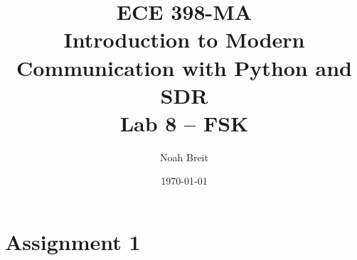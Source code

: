 \documentclass[
	letterpaper, %
	10pt, %
]{CSUniSchoolLabReport}
\title{ECE 398-MA \\ Introduction to Modern Communication with Python and SDR \\ Lab 8 -- FSK} %
\author{Noah Breit} %
\date{\today} %
\begin{document}
\maketitle %




\section{Assignment 1}
\end{document}
